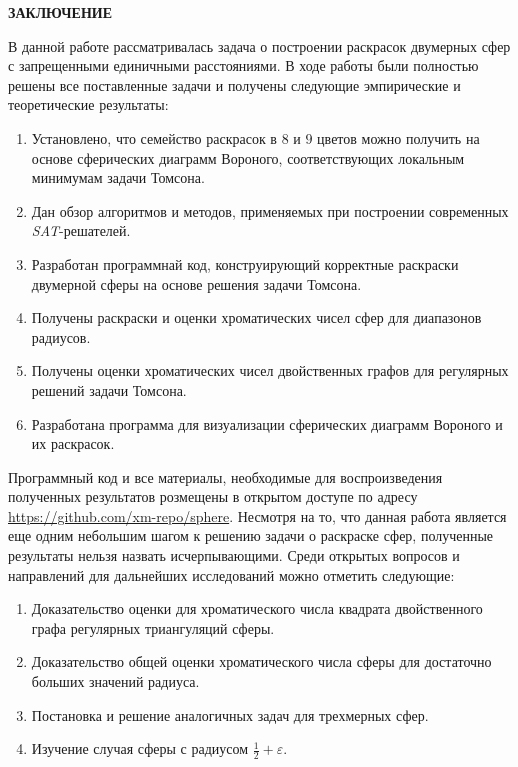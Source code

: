 \newpage
\begin{center}
\noindent\textbf{ЗАКЛЮЧЕНИЕ}\label{chapters:conclusions}
\vspace{1.5mm}
\end{center}

В данной работе рассматривалась задача о построении раскрасок двумерных сфер с запрещенными единичными расстояниями. 
В ходе работы были полностью решены все поставленные задачи и получены следующие эмпирические и теоретические результаты:

\begin{enumerate}

\item Установлено, что семейство раскрасок в $8$ и $9$ цветов можно получить на основе сферических диаграмм Вороного, соответствующих локальным минимумам задачи Томсона.  

\item Дан обзор алгоритмов и методов, применяемых при построении современных \textit{SAT}-решателей.

\item Разработан программнай код, конструирующий корректные раскраски двумерной сферы на основе решения задачи Томсона.

\item Получены раскраски и оценки хроматических чисел сфер для диапазонов радиусов.

\item Получены оценки хроматических чисел двойственных графов для регулярных решений задачи Томсона.

\item Разработана программа для визуализации сферических диаграмм Вороного и их раскрасок.

\end{enumerate}

Программный код и все материалы, необходимые для воспроизведения полученных результатов розмещены в открытом доступе по адресу
\url{https://github.com/xm-repo/sphere}.
Несмотря на то, что данная работа является еще одним небольшим шагом к решению задачи о раскраске сфер, полученные результаты нельзя назвать исчерпывающими. Среди открытых вопросов и направлений для дальнейших исследований можно отметить следующие:

\begin{enumerate}

\item Доказательство оценки для хроматического числа квадрата двойственного графа регулярных триангуляций сферы.
\item Доказательство общей оценки хроматического числа сферы для достаточно больших значений радиуса.
\item Постановка и решение аналогичных задач для трехмерных сфер.
\item Изучение случая сферы с радиусом $\frac{1}{2}+\varepsilon$.

\end{enumerate}
